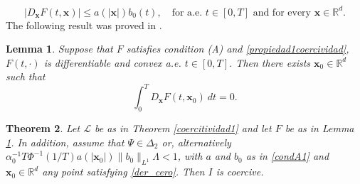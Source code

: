 \documentclass[twoside]{article}
\newtheorem{thm}{Theorem}[section]
\newtheorem{lem}[thm]{Lemma}
\theoremstyle{remark}
\renewcommand{\b}[1]{\boldsymbol{#1}}
\newcommand{\rr}{\mathbb{R}}
\renewcommand{\leq}{\leqslant}
\begin{document}
\begin{equation}\label{condA2} |D_{\b{x}}F(t,\b{x})|\leq a(|\b{x}|)b_0(t),\quad\text{for a.e. }t\in [0,T] \text{ and for every }\b{x}\in\rr^d.
\end{equation}
The following result was proved in \cite[p. 18]{mawhin2010critical}. 
\begin{lem}\label{lema_pto_cri} Suppose that $F$ satisfies condition (A) and \eqref{propiedad1coercividad}, $F(t,\cdot)$ is  differentiable and convex  a.e. $t\in [0,T]$. Then there exists $\b{x}_0\in\rr^d$ such that
\begin{equation}\label{der_cero}
 \int_0^T D_{\b{x}} F(t,\b{x}_0)\ dt=0.
\end{equation}
\end{lem}


\begin{thm}\label{segcoerthm}
Let $\mathcal{L}$ be as in Theorem \ref{coercitividad1} and let $F$ be as in Lemma \ref{lema_pto_cri}. In addition, assume that $\Psi\in\Delta_2$ or, alternatively  $\alpha_0^{-1}T\Phi^{-1}\left(1/T\right)a(|\b{x}_0|)\|b_0\|_{L^1} \Lambda<1$, with $a$ and $b_0$ as in \eqref{condA1} and $\b{x}_0\in\rr^d$  any point satisfying  \eqref{der_cero}. Then $I$ is coercive. 

\end{thm}
\end{document}
